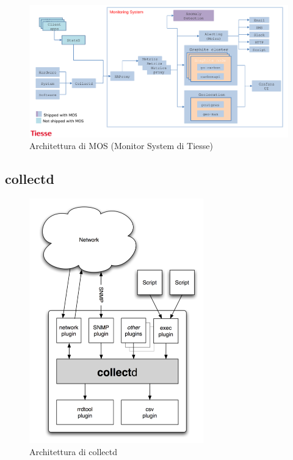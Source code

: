 \begin{figure}[]
    \label{fig:mos}
    \includegraphics[width=\hsize]{images/my_work/tiesse_mos.png}
    \caption{Architettura di MOS (Monitor System di Tiesse)}
    \centering
\end{figure}

\subsection{collectd}

\begin{figure}[]
    \label{fig:collectd}
    \begin{center}
        \includegraphics[height=300pt]{images/my_work/collectd.png}
    \end{center}
    \caption{Architettura di collectd}
    \centering
\end{figure}

